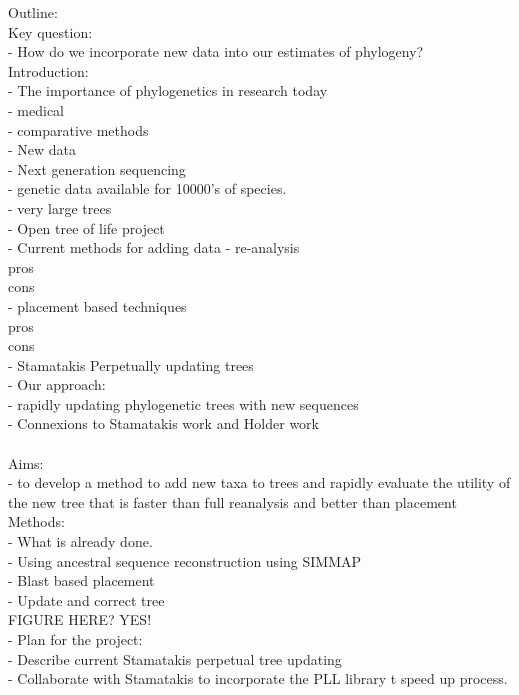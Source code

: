 
Outline:\\
Key question:\\
  - How do we incorporate new data into our estimates of phylogeny?\\

Introduction:\\
  - The importance of phylogenetics in research today\\
     - medical\\
     - comparative methods\\
  - New data\\
     - Next generation sequencing\\
     - genetic data available for 10000's of species. \\
     - very large trees\\
     - Open tree of life project\\
  - Current methods for adding data
     - re-analysis 
\\         pros
\\         cons
\\     - placement based techniques
\\         pros
\\         cons
\\     - Stamatakis Perpetually updating trees
\\  - Our approach:       
\\      - rapidly updating phylogenetic trees with new sequences
\\      - Connexions to Stamatakis work and Holder work
\\      
\\Aims:
\\ - to develop a method to add new taxa to trees and rapidly evaluate the utility of the new tree that is faster than full reanalysis and better than placement
\\Methods:
\\  - What is already done.
\\     - Using ancestral sequence reconstruction using SIMMAP
\\     - Blast based placement
\\     - Update and correct tree
\\     FIGURE HERE? YES!
\\  - Plan for the project:
\\     - Describe current Stamatakis perpetual tree updating
\\     - Collaborate with Stamatakis to incorporate the PLL library t speed up process.
